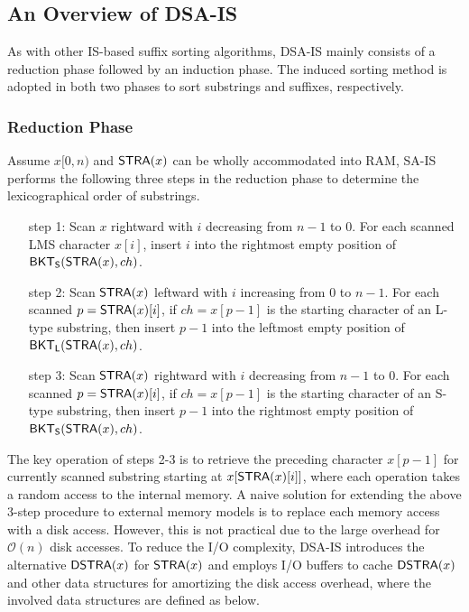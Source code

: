 \documentclass[10pt,journal,compsoc]{IEEEtran}
\begin{document}
\subsection{An Overview of DSA-IS}

As with other IS-based suffix sorting algorithms, DSA-IS mainly consists of a reduction phase followed by an induction phase. The induced sorting method is adopted in both two phases to sort substrings and suffixes, respectively.

\subsubsection{Reduction Phase}

Assume $x[0,n)$ and ${\sf STRA}(x)$ can be wholly accommodated into RAM, SA-IS performs the following three steps in the reduction phase to determine the lexicographical order of substrings.

\begin{itemize}[itemindent = 5ex]
	\item [step 1:] Scan $x$ rightward with $i$ decreasing from $n - 1$ to $0$. For each scanned LMS character $x[i]$, insert $i$ into the rightmost empty position of ${\sf BKT_S}({\sf STRA}(x), ch)$.
	
	\item [step 2:] Scan ${\sf STRA}(x)$ leftward with $i$ increasing from $0$ to $n - 1$. For each scanned $p = {\sf STRA}(x)[i]$, if $ch = x[p - 1]$ is the starting character of an L-type substring, then insert $p - 1$ into the leftmost empty position of ${\sf BKT_L}({\sf STRA}(x), ch)$.
	
	\item [step 3:] Scan ${\sf STRA}(x)$ rightward with $i$ decreasing from $n- 1$ to $0$. For each scanned $p = {\sf STRA}(x)[i]$, if $ch = x[p - 1]$ is the starting character of an S-type substring, then insert $p - 1$ into the rightmost empty position of ${\sf BKT_S}({\sf STRA}(x), ch)$.
\end{itemize}

The key operation of steps 2-3 is to retrieve the preceding character $x[p - 1]$ for currently scanned substring starting at $x[{\sf STRA}(x)[i]]$, where each operation takes a random access to the internal memory. A naive solution for extending the above 3-step procedure to external memory models is to replace each memory access with a disk access. However, this is not practical due to the large overhead for $\mathcal{O}(n)$ disk accesses. To reduce the I/O complexity, DSA-IS introduces the alternative ${\sf DSTRA}(x)$ for ${\sf STRA}(x)$ and employs I/O buffers to cache ${\sf DSTRA}(x)$ and other data structures for amortizing the disk access overhead, where the involved data structures are defined as below.
\end{document}
